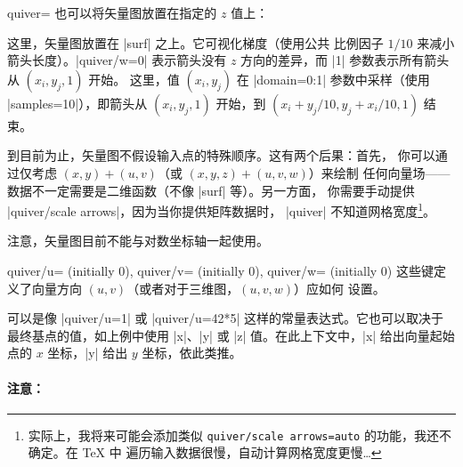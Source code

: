 {\begin{plottype}[/pgfplots]{quiver=%
    \textcolor{black}{}%
}
    也可以将矢量图放置在指定的 $z$ 值上：
\pgfplotsexpensiveexample
\begin{codeexample}[]
\end{codeexample}
    \noindent 这里，矢量图放置在 |surf| 之上。它可视化梯度（使用公共
    比例因子 $1/10$ 来减小箭头长度）。|quiver/w=0| 表示箭头没有 $z$
    方向的差异，而 |{1}| 参数表示所有箭头从 $(x_i,y_j,1)$ 开始。
    这里，值 $(x_i,y_j)$ 在 |domain=0:1| 参数中采样（使用
    |samples=10|），即箭头从 $(x_i,y_j,1)$ 开始，到
    $(x_i+y_j/10, y_j+x_i/10, 1)$ 结束。

    到目前为止，矢量图不假设输入点的特殊顺序。这有两个后果：首先，
    你可以通过仅考虑 $(x,y) + (u,v)$（或 $(x,y,z) + (u,v,w)$）来绘制
    任何向量场——数据不一定需要是二维函数（不像 |surf| 等）。另一方面，
    你需要手动提供 |quiver/scale arrows|，因为当你提供矩阵数据时，
    |quiver| 不知道网格宽度\footnote{实际上，我将来可能会添加类似
    \texttt{quiver/scale arrows=auto} 的功能，我还不确定。在 \TeX{} 中
    遍历输入数据很慢，自动计算网格宽度更慢\ldots}。

    注意，矢量图目前不能与对数坐标轴一起使用。

    \begin{pgfplotskeylist}{%
        quiver/u= (initially 0),
        quiver/v= (initially 0),
        quiver/w= (initially 0)%
    }
        这些键定义了向量方向 $(u,v)$（或者对于三维图，$(u,v,w)$）应如何
        设置。

         可以是像 |quiver/u=1| 或 |quiver/u=42*5|
        这样的常量表达式。它也可以取决于最终基点的值，如上例中使用
        |x|、|y| 或 |z| 值。在此上下文中，|x| 给出向量起始点的
        $x$ 坐标，|y| 给出 $y$ 坐标，依此类推。


        \paragraph{注意：}


\end{pgfplotskeylist}
\end{plottype}}
